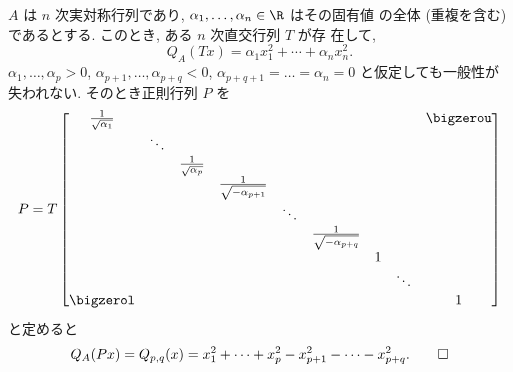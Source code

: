 \documentclass[12pt,twoside]{jarticle}
\begin{document}
\begin{question}[直交変換による実二次形式の標準形]
\label{q:sylvester-2}
  $A$ は $n$ 次実対称行列であり, $\alpha_1,\dots,\alpha_n\in\R$ はその固有値
  の全体 (重複を含む) であるとする.  このとき, ある $n$ 次直交行列 $T$ が存
  在して,
  \begin{equation*}
    Q_A(Tx) = \alpha_1 x_1^2 + \cdots + \alpha_n x_n^2.
  \end{equation*}
  $\alpha_1,\dots,\alpha_p>0$, $\alpha_{p+1},\dots,\alpha_{p+q}<0$, 
  $\alpha_{p+q+1}=\dots=\alpha_n=0$ と仮定しても一般性が失われない.
  そのとき正則行列 $P$ を
  \begin{equation*}
    P = T
    \begin{bmatrix}
      \frac{1}{\sqrt{\alpha_1}} & & & & & & & & \bigzerou \\
                                & \ddots & & & & & & & \\
                                &        & \frac{1}{\sqrt{\alpha_p}} & & & & & & \\
                                &        &                           & \frac{1}{\sqrt{-\alpha_{p+1}}} & & & & & \\
                                &        &                           &                                & \ddots & & & & \\
                                &        &                           &                                &        & \frac{1}{\sqrt{-\alpha_{p+q}}} & & & \\
                                &        &                           &                                &        &                              & 1 & & \\
                                &        &                           &                                &        &                              &   & \ddots & \\
      \bigzerol                 &        &                           &                                &        &                              &   &        & 1 \\
    \end{bmatrix}
  \end{equation*}
  と定めると
  \begin{equation*}
    Q_A(Px) = 
    Q_{p,q}(x) = x_1^2 + \cdots + x_p^2 - x_{p+1}^2 - \cdots - x_{p+q}^2.
    \qed
  \end{equation*}
\end{question}
\end{document}
